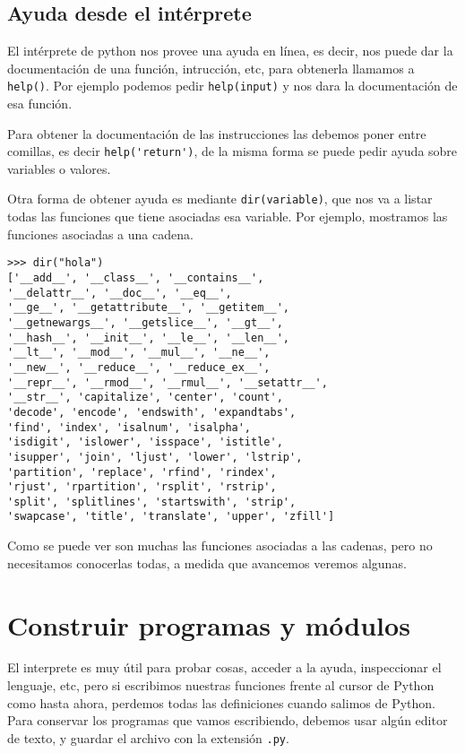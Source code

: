 \subsection{Ayuda desde el intérprete}

El intérprete de python nos provee una ayuda en línea, es decir, nos puede dar
la documentación de una función, intrucción, etc, para
obtenerla llamamos a \lstinline!help()!. Por ejemplo podemos pedir
\lstinline!help(input)! y nos dara la documentación de esa función.

Para obtener la documentación de las instrucciones las debemos poner entre
comillas, es decir \lstinline!help('return')!, de la misma forma se puede
pedir ayuda sobre variables o valores.

Otra forma de obtener ayuda es mediante \lstinline!dir(variable)!, que nos va a
listar todas las funciones que tiene asociadas esa variable. Por ejemplo,
mostramos las funciones asociadas a una cadena.

\begin{lstlisting}[numbers=none]
>>> dir("hola")
['__add__', '__class__', '__contains__',
'__delattr__', '__doc__', '__eq__',
'__ge__', '__getattribute__', '__getitem__',
'__getnewargs__', '__getslice__', '__gt__',
'__hash__', '__init__', '__le__', '__len__',
'__lt__', '__mod__', '__mul__', '__ne__',
'__new__', '__reduce__', '__reduce_ex__',
'__repr__', '__rmod__', '__rmul__', '__setattr__',
'__str__', 'capitalize', 'center', 'count',
'decode', 'encode', 'endswith', 'expandtabs',
'find', 'index', 'isalnum', 'isalpha',
'isdigit', 'islower', 'isspace', 'istitle',
'isupper', 'join', 'ljust', 'lower', 'lstrip',
'partition', 'replace', 'rfind', 'rindex',
'rjust', 'rpartition', 'rsplit', 'rstrip',
'split', 'splitlines', 'startswith', 'strip',
'swapcase', 'title', 'translate', 'upper', 'zfill']
\end{lstlisting}

Como se puede ver son muchas las funciones asociadas a las cadenas, pero no
necesitamos conocerlas todas, a medida que avancemos veremos algunas.

\section{Construir programas y módulos}

El interprete es muy útil para probar cosas, acceder a la ayuda,
inspeccionar el lenguaje, etc, pero si escribimos nuestras funciones frente
al cursor de Python como hasta ahora, perdemos todas las definiciones
cuando salimos de Python. Para conservar los programas que vamos
escribiendo, debemos usar algún editor de texto, y guardar el archivo con
la extensión \verb+.py+.

